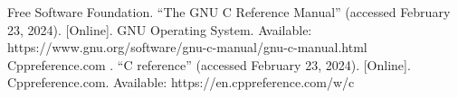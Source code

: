 \documentclass[journal]{IEEEtran}
\begin{document}
\ifCLASSOPTIONcaptionsoff
  \newpage 
\fi





%
%
%
\begin{thebibliography}{1}
Free Software Foundation. ``The GNU C Reference Manual'' (accessed February 23, 2024). [Online]. GNU Operating System. Available: https://www.gnu.org/software/gnu-c-manual/gnu-c-manual.html
Cppreference.com . ``C reference'' (accessed February 23, 2024). [Online]. Cppreference.com. Available: https://en.cppreference.com/w/c
\end{thebibliography}
\end{document}

